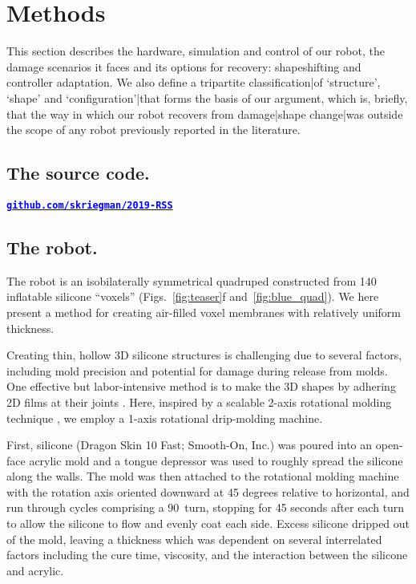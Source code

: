 
\section{Methods}
\label{sec:methods}

This section describes the hardware, simulation and control of our robot,
the damage scenarios it faces and its options for recovery: 
shapeshifting and controller adaptation.
We also define a tripartite classification|of `structure', `shape' and `configuration'|that forms the basis of our argument, which is, briefly, that the way in which our robot recovers from damage|shape change|was outside the scope of any robot previously reported in the literature.


\subsection{The source code.}
\href{https://github.com/skriegman/2019-RSS}{\textcolor{blue}{\textbf{\texttt{github.com/skriegman/2019-RSS}}}}



\subsection{The robot.}
\label{sec:robot}


The robot is an isobilaterally symmetrical quadruped constructed from 140 inflatable silicone ``voxels'' 
(Figs.~\ref{fig:teaser}f and~\ref{fig:blue_quad}).
We here present a method for creating air-filled voxel membranes with relatively uniform thickness.




Creating thin, hollow 3D silicone structures is challenging due to several factors, including mold precision and potential for damage during release from molds. One effective but labor-intensive method is to make the 3D shapes by adhering 2D films at their joints \cite{morin_elastomeric_2014}. Here, inspired by a scalable 2-axis rotational molding technique \cite{zhao_scalable_2015}, we employ a \mbox{1-axis} rotational drip-molding machine.

First, silicone (Dragon Skin 10 Fast; Smooth-On, Inc.) was poured into an open-face acrylic mold and a tongue depressor was used to roughly spread the silicone along the walls. The mold was then attached to the rotational molding machine with the rotation axis oriented downward at 45 degrees relative to horizontal, and run through cycles comprising a 90\textdegree~turn, stopping for 45 seconds after each turn to allow the silicone to flow and evenly coat each side. Excess silicone dripped out of the mold, leaving a thickness which was dependent on several interrelated factors including the cure time, viscosity, and the interaction between the silicone and acrylic.

